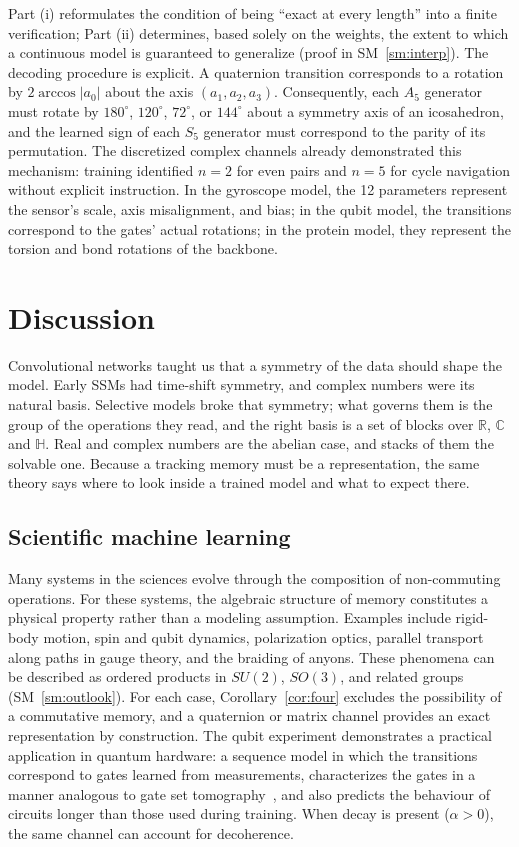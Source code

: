 \documentclass[aps,prx,reprint,superscriptaddress,longbibliography,nofootinbib,floatfix]{revtex4-2}
\newcommand{\HH}{\mathbb{H}}
\newcommand{\CC}{\mathbb{C}}
\newcommand{\RR}{\mathbb{R}}
\theoremstyle{plain}
\theoremstyle{definition}
\begin{document}
Part (i) reformulates the condition of being “exact at every length” into a finite verification; Part (ii) determines, based solely on the weights, the extent to which a continuous model is guaranteed to generalize (proof in SM~\ref{sm:interp}). The decoding procedure is explicit. A
quaternion transition corresponds to a rotation by $2\arccos|a_0|$ about the axis
$(a_1,a_2,a_3)$. Consequently, each $A_5$ generator must rotate by $180^\circ$,
$120^\circ$, $72^\circ$, or $144^\circ$ about a symmetry axis of an
icosahedron, and the learned sign of each $S_5$ generator must correspond to the parity of its permutation. The discretized complex
channels already demonstrated this mechanism: training identified $n=2$ for even pairs and $n=5$ for cycle navigation without explicit instruction. In the gyroscope model, the 12 parameters represent the sensor's scale, axis misalignment, and bias; in the qubit model, the transitions correspond to the gates' actual rotations; in the protein model, they represent the torsion and bond rotations of the backbone.

\section{Discussion}
Convolutional networks taught us that a symmetry of the
data should shape the model. Early SSMs had time-shift symmetry, and complex
numbers were its natural basis. Selective models broke that symmetry; what
governs them is the group of the operations they read, and the right basis
is a set of blocks over $\RR$, $\CC$ and $\HH$. Real and complex numbers are
the abelian case, and stacks of them the solvable one. Because a
tracking memory must be a representation, the same theory says where to
look inside a trained model and what to expect there.

\subsection{Scientific machine learning}
Many systems in the sciences
evolve through the composition of non-commuting operations. For these systems, the
algebraic structure of memory constitutes a physical property rather than a modeling assumption. Examples include rigid-body motion, spin and qubit dynamics, polarization optics, parallel transport along paths in gauge theory, and the braiding of anyons. These phenomena can be described as ordered products in $SU(2)$, $SO(3)$, and related groups (SM~\ref{sm:outlook}).
For each case, Corollary~\ref{cor:four} excludes the possibility of a commutative memory, and a quaternion or matrix channel provides an exact representation by construction. The qubit experiment demonstrates a practical application in quantum hardware: a sequence model in which the transitions correspond to gates learned from measurements, characterizes the gates in a manner analogous to gate set tomography~\cite{nielsen_gst}, and also predicts the behaviour of circuits longer than those used during training. When decay is present ($\alpha>0$), the
same channel can account for decoherence.
\end{document}
